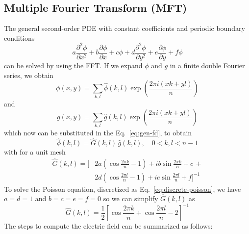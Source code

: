 \subsection{Multiple Fourier Transform (MFT)}

The general second-order PDE with constant coefficients and periodic boundary 
conditions
%
\begin{equation}
\label{eq:gen-fd}
a \frac{\partial^2 \phi}{\partial x^2}+b\frac{\partial \phi}{\partial x}+c\phi +
d \frac{\partial^2 \phi}{\partial y^2}+e\frac{\partial \phi}{\partial y}+f\phi
\end{equation}
%
can be solved by using the FFT. If we expand $\phi$ and $g$ in a finite double 
Fourier series, we obtain
%
\begin{equation}
\phi(x,y) = \sum_{k,l} \hat \phi(k, l) \exp\left({\frac{2\pi i (xk + 
yl)}{n}}\right)
\end{equation}
%
and
%
\begin{equation}
g(x,y) = \sum_{k,l} \hat g(k, l) \exp\left({\frac{2\pi i (xk + yl)}{n}}\right)
\end{equation}
%
which now can be substituted in the Eq.~\ref{eq:gen-fd}, to obtain
%
\begin{equation}
\hat \phi(k,l) = \hat G(k,l) \, \hat g(k,l),\quad 0<k,l<n-1
\end{equation}
%
with for a unit mesh
%
\begin{equation}
\begin{split}
\hat G(k,l) = \Bigg[
& 2a \left( \cos \frac{2\pi k}{n} - 1 \right) +
ib \sin \frac{2\pi k}{n} + c \,+ \\
& 2d \left( \cos \frac{2\pi l}{n} - 1 \right) +
ie \sin \frac{2\pi l}{n} + f
\Bigg]^{-1}
\end{split}
\end{equation}
%
To solve the Poisson equation, discretized as Eq.~\ref{eq:discrete-poisson}, we 
have $a=d=1$ and $b=c=e=f=0$ so we can simplify $\hat G(k,l)$ as
%
\begin{equation}
\hat G(k,l) = \frac{1}{2}\left[
\cos \frac{2\pi k}{n} +
\cos \frac{2\pi l}{n} -
2 \right]^{-1}
\end{equation}
%
The steps to compute the electric field can be summarized as follows:
%
\begin{center}
\end{center}
